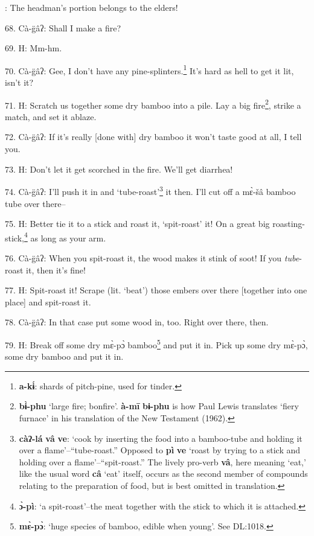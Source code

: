 : The headman's
portion belongs to the elders!

68. Cà-g̈âʔ: Shall I make a fire?

69. H: Mm-hm.

70. Cà-g̈âʔ: Gee, I don't have any pine-splinters.\footnote{\textbf{a-kɨ́}: shards of pitch-pine, used for tinder.} It's hard as hell to
get it lit, isn't it?

71. H: Scratch us together some dry bamboo into a pile. Lay a big fire\footnote{\textbf{bɨ̀-phu} `large fire; bonfire'. \textbf{à-mī} \textbf{bɨ-phu} is how Paul Lewis translates `fiery furnace' in his translation of the New Testament (1962).}, strike
a match, and set it ablaze.

72. Cà-g̈âʔ: If it's really [done with] dry bamboo it won't taste good at all,
I tell you.

73. H: Don't let it get scorched in the fire. We'll get diarrhea!

\begin{center}
\end{center}

74. Cà-g̈âʔ: I'll push it in and `tube-roast'\footnote{\textbf{càʔ-lá} \textbf{vâ} \textbf{ve}: `cook by inserting the food into a bamboo-tube and holding it over a flame'--``tube-roast.'' Opposed to \textbf{pì} \textbf{ve} `roast by trying to a stick and holding over a flame'--``spit-roast.'' The lively pro-verb \textbf{vâ}, here meaning `eat,' like the usual word \textbf{câ} `eat' itself, occurs as the second member of compounds relating to the preparation of food, but is best omitted in translation.} it then. I'll cut off a
mɛ̀-šâ bamboo tube over there--

75. H: Better tie it to a stick and roast it, `spit-roast' it! On a great big roasting-stick,\footnote{\textbf{ɔ̀-pì}: `a spit-roast'--the meat together with the stick to which it is attached.}
as long as your arm.

76. Cà-g̈âʔ: When you spit-roast it, the wood makes it stink of soot! If you
\emph{tube}-roast it, then it's fine!

77. H: Spit-roast it! Scrape (lit. `beat') those embers over there [together into
one place] and spit-roast it.

78. Cà-g̈âʔ: In that case put some wood in, too. Right over there, then.

79. H: Break off some dry mɛ̀-pɔ̀ bamboo\footnote{\textbf{mɛ̀-pɔ̀}: `huge species of bamboo, edible when young'. See DL:1018.} and put it in. Pick up some dry
mɛ̀-pɔ̀, some dry bamboo and put it in.

